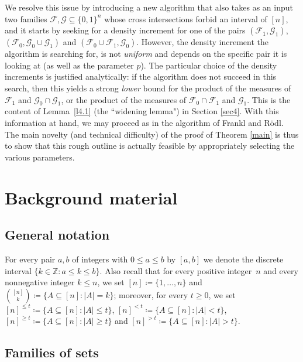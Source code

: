 \documentclass[10pt]{amsart}
\theoremstyle{remark}
\newcommand{\meg}{\geqslant}
\newcommand{\mik}{\leqslant}
\newcommand{\Fcal}{\mathcal{F}}
\newcommand{\Gcal}{\mathcal{G}}
\begin{document}
We resolve this issue by introducing a new algorithm that also takes as an input two families
$\Fcal,\Gcal\subseteq \{0,1\}^n$ whose cross intersections forbid an interval of $[n]$, and it starts by seeking
for a density increment for one of the pairs $(\Fcal_1,\Gcal_1)$, $(\Fcal_0, \Gcal_0\cup \Gcal_1)$
and $(\Fcal_0\cup\Fcal_1, \Gcal_0)$. However, the density increment the algorithm is searching for,
is not \textit{uniform} and depends on the specific pair it is looking at (as well as the parameter $p$).
The particular choice of the density increments is justified analytically: if the algorithm does not
succeed in this search, then this yields a strong \textit{lower} bound for the product of the measures
of $\Fcal_1$ and $\Gcal_0\cap \Gcal_1$, or the product of the measures of $\Fcal_0\cap\Fcal_1$
and $\Gcal_1$. This is the content of Lemma~\ref{l4.1} (the ``widening lemma") in Section \ref{sec4}.
With this information at hand, we may proceed as in the algorithm of Frankl and R\"{o}dl.
The main novelty (and technical difficulty) of the proof of Theorem \ref{main} is thus to show
that this rough outline is actually feasible by appropriately selecting the various parameters.


\section{Background material} \label{sec2}

\subsection{General notation} \label{subsec2.1}

For every pair $a,b$ of integers with $0\mik a\mik b$ by $[a,b]$ we denote the discrete
interval $\{k\in\mathbb{Z}: a\mik k \mik b\}$. Also recall that for every positive integer~$n$
and every nonnegative integer $k\mik n$, we set $[n]\coloneqq \{1,\dots,n\}$ and
$\binom{[n]}{k}\coloneqq\{A\subseteq [n]: |A|=k\}$; moreover, for every
$t\meg 0$, we set $[n]^{\mik t}\coloneqq \{A\subseteq [n]: |A|\mik t\}$,
$[n]^{<t}\coloneqq \{A\subseteq [n]: |A|<t\}$,
$[n]^{\meg t}\coloneqq \{A\subseteq [n]: |A|\meg t\}$ and
$[n]^{>t}\coloneqq \{A\subseteq [n]: |A|>t\}$.

\subsection{Families of sets} \label{subsec2.2}
\end{document}
